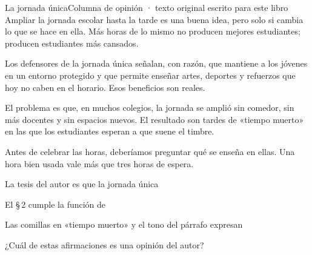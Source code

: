 \bitacora

\evaluacion
\begin{texto}{La jornada única}{Columna de opinión · texto original escrito para este libro}
\pa Ampliar la jornada escolar hasta la tarde es una buena idea, pero solo si cambia lo que se hace en ella. Más horas de
lo mismo no producen mejores estudiantes; producen estudiantes más cansados.

\pa Los defensores de la jornada única señalan, con razón, que mantiene a los jóvenes en un entorno protegido y que
permite enseñar artes, deportes y refuerzos que hoy no caben en el horario. Esos beneficios son reales.

\pa El problema es que, en muchos colegios, la jornada se amplió sin comedor, sin más docentes y sin espacios nuevos. El
resultado son tardes de «tiempo muerto» en las que los estudiantes esperan a que suene el timbre.

\pa Antes de celebrar las horas, deberíamos preguntar qué se enseña en ellas. Una hora bien usada vale más que tres horas
de espera.
\end{texto}
\begin{ejercicios}
\item La tesis del autor es que la jornada única
\item El \S\,2 cumple la función de
\item Las comillas en «tiempo muerto»  y el tono del párrafo expresan
\item ¿Cuál de estas afirmaciones es una opinión del autor?
\end{ejercicios}

